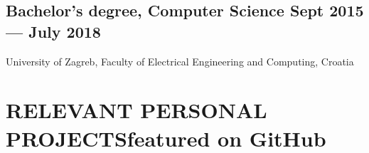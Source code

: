 \documentclass{article}
\begin{document}
\subsection{Bachelor's degree, Computer Science \hfill Sept 2015 --- July 2018}
University of Zagreb, Faculty of Electrical Engineering and Computing, Croatia


\section{RELEVANT PERSONAL PROJECTS\hfill featured on GitHub}


\end{document}

